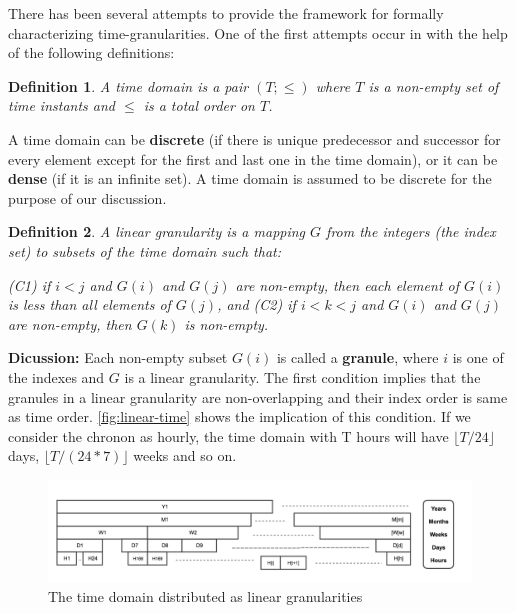 \documentclass[12pt]{article}
\begin{document}
There has been several attempts to provide the framework for formally
characterizing time-granularities. One of the first attempts occur in
\citep{Bettini1998-ed} with the help of the following definitions:

\newtheorem{timedom}{Definition}
\begin{timedom}\label{def:timedom}
A time domain is a pair $(T; \le)$ where $T$ is a non-empty set of time instants and $\le$ is a total order on $T$.
\end{timedom}

A time domain can be \textbf{discrete} (if there is unique predecessor
and successor for every element except for the first and last one in the
time domain), or it can be \textbf{dense} (if it is an infinite set). A
time domain is assumed to be discrete for the purpose of our discussion.

\begin{timedom}\label{def:linear}
A linear granularity is a mapping $G$ from the integers (the index set) to subsets of the time domain such that:

  (C1) if $i < j$ and $G(i)$ and $G(j)$ are non-empty, then each element of $G(i)$ is less
than all elements of $G(j)$, and  
  (C2) if $i < k < j$ and $G(i)$ and $G(j)$ are non-empty, then $G(k)$ is non-empty.  
\end{timedom}

\textbf{Dicussion:} Each non-empty subset \(G(i)\) is called a
\textbf{granule}, where \(i\) is one of the indexes and \(G\) is a
linear granularity. The first condition implies that the granules in a
linear granularity are non-overlapping and their index order is same as
time order. \autoref{fig:linear-time} shows the implication of this
condition. If we consider the chronon \citep{aigner2011visualization} as
hourly, the time domain with T hours will have \(\lfloor T/24\rfloor\)
days, \(\lfloor T/(24*7)\rfloor\) weeks and so on.

\begin{figure}

{\centering \includegraphics[width=1\linewidth]{Figs/linear-time} 

}

\caption{The time domain distributed as linear granularities}\label{fig:linear-time}
\end{figure}
\end{document}
